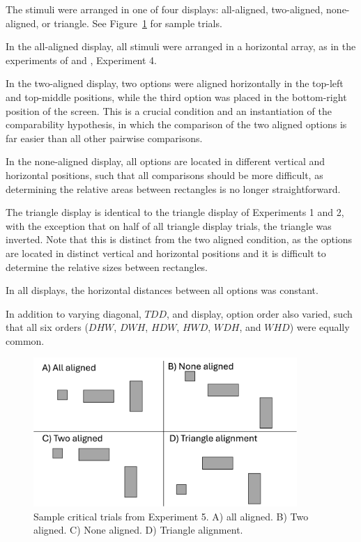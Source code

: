 
The stimuli were arranged in one of four displays: all-aligned, two-aligned, none-aligned, or triangle. See Figure~\ref{fig:comparability_trials} for sample trials. 

In the all-aligned display, all stimuli were arranged in a horizontal array, as in the experiments of \textcite{trueblood2013not} and \textcite{spektorWhenGoodLooks2018b}, Experiment 4.

In the two-aligned display, two options were aligned horizontally in the top-left and top-middle positions, while the third option was placed in the bottom-right position of the screen. This is a crucial condition and an instantiation of the comparability hypothesis, in which the comparison of the two aligned options is far easier than all other pairwise comparisons.

In the none-aligned display, all options are located in different vertical and horizontal positions, such that all comparisons should be more difficult, as determining the relative areas between rectangles is no longer straightforward.

The triangle display is identical to the triangle display of Experiments 1 and 2, with the exception that on half of all triangle display trials, the triangle was inverted. Note that this is distinct from the two aligned condition, as the options are located in distinct vertical and horizontal positions and it is difficult to determine the relative sizes between rectangles. 

In all displays, the horizontal distances between all options was constant.

In addition to varying diagonal, $TDD$, and display, option order also varied, such that all six orders ($DHW$, $DWH$, $HDW$, $HWD$, $WDH$, and $WHD$) were equally common.

\begin{figure}
   \begin{center}
      \includegraphics[width=100mm]{figures/comparability_design.jpg}
      \caption{Sample critical trials from Experiment 5. A) all aligned. B) Two aligned. C) None aligned. D) Triangle alignment.}
      \label{fig:comparability_trials}
   \end{center}
\end{figure}

